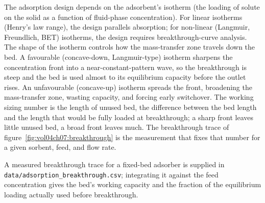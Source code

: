 The adsorption design depends on the adsorbent's isotherm (the
loading of solute on the solid as a function of fluid-phase
concentration). For linear isotherms (Henry's law range), the design
parallels absorption; for non-linear (Langmuir, Freundlich, BET)
isotherms, the design requires breakthrough-curve analysis. The shape
of the isotherm controls how the mass-transfer zone travels down the
bed. A favourable (concave-down, Langmuir-type) isotherm sharpens the
concentration front into a near-constant-pattern wave, so the
breakthrough is steep and the bed is used almost to its equilibrium
capacity before the outlet rises. An unfavourable (concave-up) isotherm
spreads the front, broadening the mass-transfer zone, wasting capacity,
and forcing early switchover. The working sizing number is the
length of unused bed, the difference between the bed length and the
length that would be fully loaded at breakthrough; a sharp front leaves
little unused bed, a broad front leaves much. The breakthrough trace of
figure~\ref{fig:vol04ch07:breakthrough} is the measurement that fixes
that number for a given sorbent, feed, and flow rate.



A measured breakthrough trace for a fixed-bed adsorber is supplied in
\texttt{data/adsorption\_breakthrough.csv}; integrating it against the
feed concentration gives the bed's working capacity and the fraction of
the equilibrium loading actually used before breakthrough.

